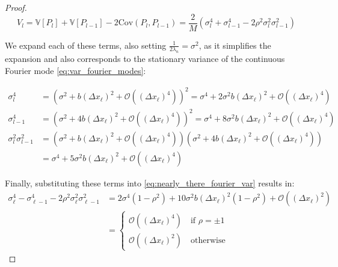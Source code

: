 \begin{proof}
    \begin{equation}\label{eq:nearly_there_fourier_var}
        V_l = \mathbb{V}[P_l] + \mathbb{V}[P_{l-1}] - 
        2\mathrm{Cov}(P_l, P_{l-1}) = 
        \frac{2}{M}(\sigma_l^4 + \sigma_{l-1}^4 -
        2\rho^2 \sigma_l^2 \sigma_{l-1}^2)
    \end{equation}

    We expand each of these terms, also setting 
    $\frac{1}{2\lambda_n} = \sigma^2$, as it simplifies the expansion and 
    also corresponds to the stationary variance of the
    continuous Fourier mode \eqref{eq:var_fourier_modes}:

    \begin{align*}
        \sigma_l^4 &= \left(\sigma^2 + b (\Delta x_\ell)^2 + 
        \mathcal{O}\left((\Delta x_\ell)^4\right)\right)^2 = 
        \sigma^4 + 
        2 \sigma^2 b (\Delta x_\ell)^2 + \mathcal{O}\left((\Delta x_\ell)^4\right)
        \\
        \sigma_{l-1}^4 &= \left(\sigma^2 + 4b (\Delta x_\ell)^2 + 
        \mathcal{O}\left((\Delta x_\ell)^4\right)\right)^2 =
        \sigma^4 + 8\sigma^2 b(\Delta x_\ell)^2 + 
        \mathcal{O}\left((\Delta x_\ell)^4\right)
        \\
        \sigma_l^2 \sigma_{l-1}^2 &= \left(\sigma^2+ b(\Delta x_\ell)^2 + 
        \mathcal{O}\left((\Delta x_\ell)^4\right)\right)(\sigma^2
        + 4b(\Delta x_\ell)^2 + \mathcal{O}\left((\Delta x_\ell)^4\right))\\
        &= \sigma^4 + 5\sigma^2b(\Delta x_\ell)^2 + 
        \mathcal{O}\left((\Delta x_\ell)^4\right)
    \end{align*}

    Finally, substituting these terms into \eqref{eq:nearly_there_fourier_var}
    results in:
    \begin{align*}
        \sigma_\ell^4 - \sigma_{\ell-1}^4 - 2\rho^2 \sigma_\ell^2 
        \sigma_{\ell-1}^2 &= 2 \sigma^4(1 - \rho^2) + 10 \sigma^2b 
        (\Delta x_\ell)^2(1 - \rho^2) + 
        \mathcal{O}\left((\Delta x_\ell)^2\right) \\
        &= \begin{cases}
        \mathcal{O}\left((\Delta x_\ell)^4\right) \quad \text{if } 
        \rho = \pm 1 \\
        \mathcal{O}\left((\Delta x_\ell)^2\right) \quad \text{otherwise}
        \end{cases}
    \end{align*}

\end{proof}


